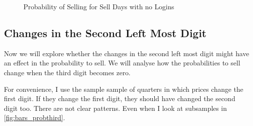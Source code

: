\begin{figure}[hp]
	\centering%
	\caption{Probability of Selling for Sell Days with no Logins}%
	\label{fig:bars_prob}%
	\fignote{  }
\end{figure}


\clearpage


\subsection{Changes in the Second Left Most Digit}

Now we will explore whether the changes in the second left most digit might have an effect in the probability to sell. We will analyse how the probabilities to sell change when the third digit becomes zero.

For convenience, I use the sample sample of quarters in which prices change the first digit. If they change the first digit, they should have changed the second digit too. There are not clear patterns. Even when I look at subsamples in \ref{fig:bars_probthird}.

